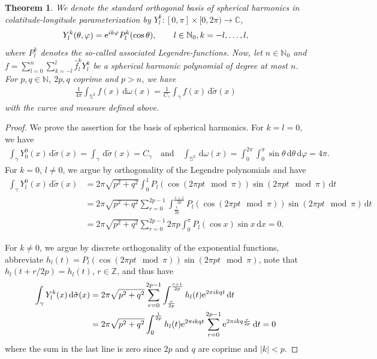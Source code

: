 \documentclass[11pt,a4paper,twoside,final,biblatex]{scrartcl}
\newcommand{\N}{\ensuremath{\mathbb{N}}}
\newcommand{\NZ}{\ensuremath{\mathbb{N}_{0}}}
\renewcommand{\S}{\ensuremath{\mathbb{S}}}
\newcommand{\Z}{\ensuremath{\mathbb{Z}}}
\newcommand{\C}{\ensuremath{\mathbb{C}}}
\newcommand{\e}{\textnormal{e}}
\renewcommand{\d}{\,\mathrm{d}}
\newtheorem{theorem}{Theorem}[section]
\theoremstyle{definition}
\numberwithin{equation}{section}
\numberwithin{table}{section}
\numberwithin{figure}{section}
\begin{document}
\begin{theorem}
 We denote the standard orthogonal basis of spherical harmonics in colatitude-longitude parameterization by $Y^k_l\colon [0,\pi]\times[0,2\pi) \to\C$,
 \begin{align}\label{eq:Ykl}
     Y^k_l(\theta,\varphi)=\e^{i k\varphi} P^k_l(\cos\theta),\qquad l\in\NZ,k=-l,\hdots,l,
 \end{align}
 where $P^k_l$ denotes the so-called associated Legendre-functions. 
 Now, let $n\in \NZ$ and $f=\sum_{l=0}^n\sum_{k=-l}^l \hat f^k_l Y^k_l$ be a spherical harmonic polynomial of degree at most $n$.
 For $p,q\in\N$, $2p,q$ coprime and $p>n$, we have
    \begin{align*}
     \frac{1}{4\pi}\int_{\S^2} f(x) \d\omega(x)
     =\frac{1}{C_{\gamma}}\int_\gamma f(x) \d\tilde\sigma(x)
 \end{align*}
 with the curve and measure defined above.
\end{theorem}
\begin{proof}
  We prove the assertion for the basis of spherical harmonics.
  For $k=l=0$, we have
 \begin{align*}
     \int_\gamma Y^0_0(x) \d\tilde\sigma(x)
     =\int_\gamma \d\tilde\sigma(x)
     =C_\gamma
     \quad\text{and}\quad
     \int_{\S^2} \d\omega(x)=
     \int_0^{2\pi} \int_0^\pi \sin\theta \d\theta\d\varphi=4\pi.
 \end{align*}
 For $k=0$, $l\ne 0$, we argue by orthogonality of the Legendre polynomials and have
 \begin{align*}
     \int_\gamma Y^0_l(x) \d\tilde\sigma(x)
    &=2\pi\sqrt{p^2+q^2}
      \int_0^1 P_l(\cos(2\pi p t \mod \pi)) \sin(2\pi p t \mod \pi) \d t\\
    &=2\pi\sqrt{p^2+q^2} \sum_{r=0}^{2p-1}
      \int_{\frac{r}{2p}}^{\frac{r+1}{2p}} P_l(\cos(2\pi p t \mod \pi)) \sin(2\pi p t \mod \pi) \d t\\
    &=2\pi\sqrt{p^2+q^2} \sum_{r=0}^{2p-1}
        2\pi p \int_0^\pi P_l(\cos x) \sin x \d x=0.
 \end{align*}

 For $k\ne 0$, we argue by discrete orthogonality of the exponential functions, abbreviate $h_l(t)=P_l(\cos(2\pi p t \mod \pi)) \sin(2\pi p t \mod \pi)$, note that $h_l(t+r/2p)=h_l(t)$, $r\in\Z$, and thus have
\begin{align*}
     \int_\gamma Y^k_l(x) \d\tilde\sigma(x)
    &=2\pi\sqrt{p^2+q^2} \sum_{r=0}^{2p-1}
      \int_{\frac{r}{2p}}^{\frac{r+1}{2p}} h_l(t) \e^{2\pi ikqt} \d t\\
    &=2\pi\sqrt{p^2+q^2} \int_{0}^{\frac{1}{2p}} h_l(t) \e^{2\pi ikqt} \sum_{r=0}^{2p-1} \e^{2\pi ikq  \frac{r}{2p}} \d t=0
 \end{align*}
 where the sum in the last line is zero since $2p$ and $q$ are coprime and $|k|<p$.
\end{proof}
\end{document}
